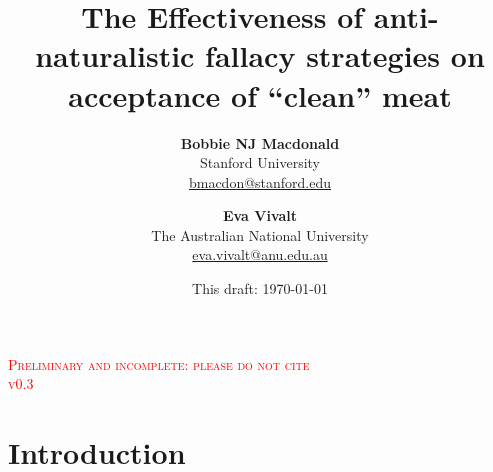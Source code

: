 \documentclass[12pt]{article}
\title{
    \vspace{-8mm}
    \Huge\selectfont\textbf{The Effectiveness of anti-naturalistic fallacy strategies on acceptance of ``clean'' meat} \\[5mm] 
    \vspace{5mm}
}
\author{\textbf{Bobbie NJ Macdonald} \\
        Stanford University \\
        {\href{mailto:bmacdon@stanford.edu}{bmacdon@stanford.edu}} \\
    \and \textbf{Eva Vivalt} \\
        The Australian National University \\
        {\href{mailto:eva.vivalt@anu.edu.au}{eva.vivalt@anu.edu.au}} \\
}
\date{This draft: \today{}}
\newcommand{\todo}[1]{\textit{\textcolor{red}{$<$todo$>$ #1 $<$/todo$>$}}}
\begin{document}
\maketitle
\thispagestyle{empty}

\begin{centering}
    \Large \textsc{\textcolor{red}{Preliminary and incomplete: please do not cite}} \\
    \Large \textsc{\textcolor{red}{v0.3}} \\
    \vspace{10mm}
\end{centering}







\setcounter{page}{1}

\section{Introduction}
\label{sec:intro}

\end{document}
